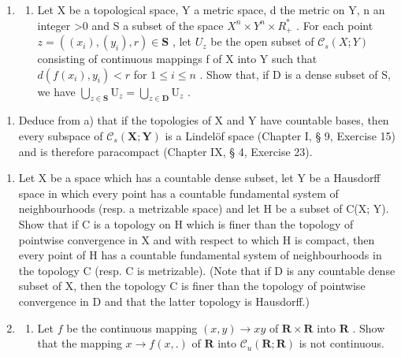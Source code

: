 \begin{enumerate}
\def\labelenumi{\arabic{enumi})}
\setcounter{enumi}{5}
\tightlist
\item
  \begin{enumerate}
  \def\labelenumii{\alph{enumii})}
  \tightlist
  \item
    Let X be a topological space, Y a metric space, d the metric on Y, n an integer \textgreater0 and S a subset of the space \(X^{n} \times Y^{n} \times R_{+}^{*}\) . For each point \(z = ((x_{i}), (y_{i}), r) \in \mathbf{S}\) , let \(U_{z}\) be the open subset of \(\mathcal{C}_{s}(X; Y)\) consisting of continuous mappings f of X into Y such that \(d(f(x_i), y_i) < r\) for \(1 \leqslant i \leqslant n\) . Show that, if D is a dense subset of S, we have \(\bigcup_{z \in \mathbf{S}} \mathrm{U}_z = \bigcup_{z \in \mathbf{D}} \mathrm{U}_z\) .
  \end{enumerate}
\end{enumerate}

\begin{enumerate}
\def\labelenumi{\alph{enumi})}
\setcounter{enumi}{1}
\tightlist
\item
  Deduce from a) that if the topologies of X and Y have countable bases, then every subspace of \(\mathcal{C}_{s}(\mathbf{X};\mathbf{Y})\) is a Lindelöf space (Chapter I, § 9, Exercise 15) and is therefore paracompact (Chapter IX, § 4, Exercise 23).
\end{enumerate}

\begin{enumerate}
\def\labelenumi{\arabic{enumi})}
\setcounter{enumi}{6}
\item
  Let X be a space which has a countable dense subset, let Y be a Hausdorff space in which every point has a countable fundamental system of neighbourhoods (resp. a metrizable space) and let H be a subset of C(X; Y). Show that if C is a topology on H which is finer than the topology of pointwise convergence in X and with respect to which H is compact, then every point of H has a countable fundamental system of neighbourhoods in the topology C (resp. C is metrizable). (Note that if D is any countable dense subset of X, then the topology C is finer than the topology of pointwise convergence in D and that the latter topology is Hausdorff.)
\item
  \begin{enumerate}
  \def\labelenumii{\alph{enumii})}
  \tightlist
  \item
    Let \(f\) be the continuous mapping \((x, y) \to xy\) of \(\mathbf{R} \times \mathbf{R}\) into \(\mathbf{R}\) . Show that the mapping \(x \to f(x, .)\) of \(\mathbf{R}\) into \(\mathcal{C}_u(\mathbf{R}; \mathbf{R})\) is not continuous.
  \end{enumerate}
\end{enumerate}


